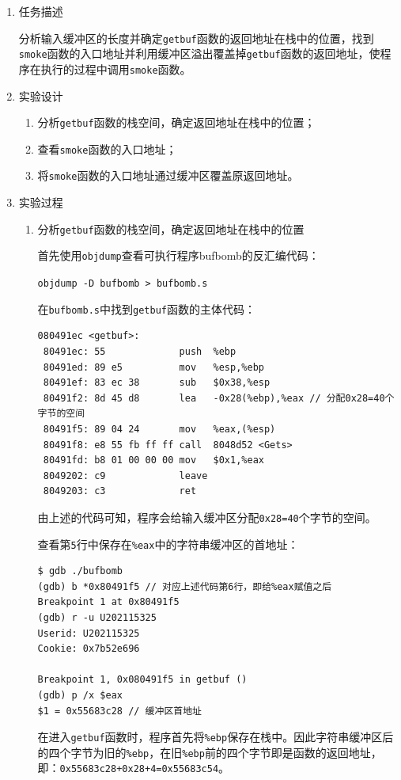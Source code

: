 \documentclass{paper}
\begin{document}
\begin{enumerate}
\item 任务描述

分析输入缓冲区的长度并确定\verb|getbuf|函数的返回地址在栈中的位置，找到\verb|smoke|函数的入口地址并利用缓冲区溢出覆盖掉\verb|getbuf|函数的返回地址，使程序在执行的过程中调用\verb|smoke|函数。

\item 实验设计

\begin{enumerate}
\item 分析\verb|getbuf|函数的栈空间，确定返回地址在栈中的位置；
\item 查看\verb|smoke|函数的入口地址；
\item 将\verb|smoke|函数的入口地址通过缓冲区覆盖原返回地址。
\end{enumerate}

\item 实验过程 \label{l7}

\begin{enumerate}
\item 分析\verb|getbuf|函数的栈空间，确定返回地址在栈中的位置 \label{l6}

首先使用\verb|objdump|查看可执行程序bufbomb的反汇编代码：

\verb|objdump -D bufbomb > bufbomb.s|

在\verb|bufbomb.s|中找到\verb|getbuf|函数的主体代码：
\begin{lstlisting}
080491ec <getbuf>:
 80491ec: 55             push  %ebp
 80491ed: 89 e5          mov   %esp,%ebp
 80491ef: 83 ec 38       sub   $0x38,%esp
 80491f2: 8d 45 d8       lea   -0x28(%ebp),%eax // 分配0x28=40个字节的空间
 80491f5: 89 04 24       mov   %eax,(%esp)
 80491f8: e8 55 fb ff ff call  8048d52 <Gets>
 80491fd: b8 01 00 00 00 mov   $0x1,%eax
 8049202: c9             leave
 8049203: c3             ret
\end{lstlisting}
由上述的代码可知，程序会给输入缓冲区分配\verb|0x28=40|个字节的空间。

查看第\verb|5|行中保存在\verb|%eax|中的字符串缓冲区的首地址：
\begin{lstlisting}
$ gdb ./bufbomb
(gdb) b *0x80491f5 // 对应上述代码第6行，即给%eax赋值之后
Breakpoint 1 at 0x80491f5
(gdb) r -u U202115325
Userid: U202115325
Cookie: 0x7b52e696

Breakpoint 1, 0x080491f5 in getbuf ()
(gdb) p /x $eax
$1 = 0x55683c28 // 缓冲区首地址
\end{lstlisting}
在进入\verb|getbuf|函数时，程序首先将\verb|%ebp|保存在栈中。因此字符串缓冲区后的四个字节为旧的\verb|%ebp|，在旧\verb|%ebp|前的四个字节即是函数的返回地址，即：\verb|0x55683c28+0x28+4=0x55683c54|。


\end{enumerate}
\end{enumerate}
\end{document}
